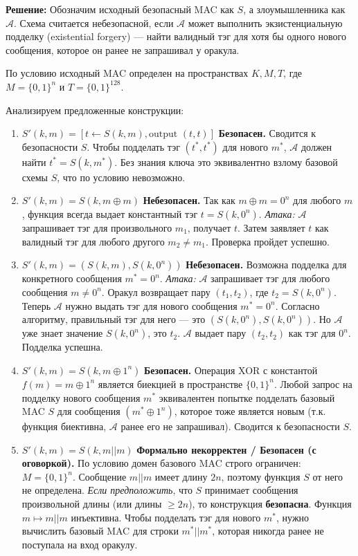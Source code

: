 \textbf{Решение:} Обозначим исходный безопасный MAC как \(S\), а злоумышленника как \(\mathcal{A}\). Схема считается небезопасной, если \(\mathcal{A}\) может выполнить экзистенциальную подделку (existential forgery) --- найти валидный тэг для хотя бы одного нового сообщения, которое он ранее не запрашивал у оракула.

По условию исходный MAC определен на пространствах \(K, M, T\), где \(M=\{0,1\}^n\) и \(T=\{0,1\}^{128}\).

Анализируем предложенные конструкции:

\begin{enumerate}
\def\labelenumi{\arabic{enumi}.}
\item
  \textbf{\(S'(k, m) = [t \leftarrow S(k,m), \text{output } (t, t)]\)} \textbf{Безопасен.} Сводится к безопасности \(S\). Чтобы подделать тэг \((t^*, t^*)\) для нового \(m^*\), \(\mathcal{A}\) должен найти \(t^* = S(k, m^*)\). Без знания ключа это эквивалентно взлому базовой схемы \(S\), что по условию невозможно.
\item
  \textbf{\(S'(k, m) = S(k, m \oplus m)\)} \textbf{Небезопасен.} Так как \(m \oplus m = 0^n\) для любого \(m\), функция всегда выдает константный тэг \(t = S(k, 0^n)\). \emph{Атака:} \(\mathcal{A}\) запрашивает тэг для произвольного \(m_1\), получает \(t\). Затем заявляет \(t\) как валидный тэг для любого другого \(m_2 \neq m_1\). Проверка пройдет успешно.
\item
  \textbf{\(S'(k, m) = (S(k, m), S(k, 0^n))\)} \textbf{Небезопасен.} Возможна подделка для конкретного сообщения \(m^* = 0^n\). \emph{Атака:} \(\mathcal{A}\) запрашивает тэг для любого сообщения \(m \neq 0^n\). Оракул возвращает пару \((t_1, t_2)\), где \(t_2 = S(k, 0^n)\). Теперь \(\mathcal{A}\) нужно выдать тэг для нового сообщения \(m^* = 0^n\). Согласно алгоритму, правильный тэг для него --- это \((S(k, 0^n), S(k, 0^n))\). Но \(\mathcal{A}\) уже знает значение \(S(k, 0^n)\), это \(t_2\). \(\mathcal{A}\) выдает пару \((t_2, t_2)\) как тэг для \(0^n\). Подделка успешна.
\item
  \textbf{\(S'(k, m) = S(k, m \oplus 1^n)\)} \textbf{Безопасен.} Операция XOR с константой \(f(m) = m \oplus 1^n\) является биекцией в пространстве \(\{0,1\}^n\). Любой запрос на подделку нового сообщения \(m^*\) эквивалентен попытке подделать базовый MAC \(S\) для сообщения \((m^* \oplus 1^n)\), которое тоже является новым (т.к. функция биективна, \(\mathcal{A}\) ранее его не запрашивал). Сводится к безопасности \(S\).
\item
  \textbf{\(S'(k, m) = S(k, m || m)\)} \textbf{Формально некорректен / Безопасен (с оговоркой).} По условию домен базового MAC строго ограничен: \(M=\{0,1\}^n\). Сообщение \(m||m\) имеет длину \(2n\), поэтому функция \(S\) от него не определена. \emph{Если предположить}, что \(S\) принимает сообщения произвольной длины (или длины \(\ge 2n\)), то конструкция \textbf{безопасна}. Функция \(m \mapsto m||m\) инъективна. Чтобы подделать тэг для нового \(m^*\), нужно вычислить базовый MAC для строки \(m^* || m^*\), которая никогда ранее не поступала на вход оракулу.

\end{enumerate}
